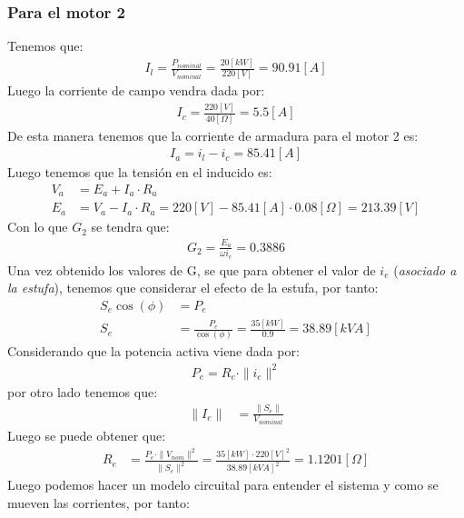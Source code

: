 \documentclass[
  11pt,
  letterpaper,
   addpoints,
   answers
  ]{exam}
\begin{document}
\begin{questions}
\begin{solution}
   \subsubsection*{Para el motor 2}
   Tenemos que:
   \begin{align}
        I_{l} = \frac{P_{nominal}}{V_{nominal}} = \frac{20[kW]}{220[V]} = 90.91[A]
   \end{align}
   Luego la corriente de campo vendra dada por:
    \begin{align}
          I_{c} = \frac{220[V]}{40[\Omega]} = 5.5[A]
    \end{align}
    De esta manera tenemos que la corriente de armadura para el motor 2 es:
    \begin{align}
        I_{a} = i_{l} - i_{c} = 85.41[A]
    \end{align}
    Luego tenemos que la tensión en el inducido es:
    \begin{align}
        V_{a} &= E_{a} + I_{a} \cdot R_{a}\\
        E_{a} &= V_{a} - I_{a} \cdot R_{a} = 220[V] - 85.41[A] \cdot 0.08[\Omega] = 213.39[V]
    \end{align}
    Con lo que $G_{2}$ se tendra que:
    \begin{align}
        G_{2}= \frac{E_{a}}{\omega i_{c} } =0.3886
    \end{align}
    Una vez obtenido los valores de G, se que para obtener el valor de $i_{e}$ (\textit{asociado a la estufa}), tenemos que considerar el efecto de la estufa, por tanto:
    \begin{align}
        S_{e}\cos(\phi) &= P_{e}\\
        S_{e} &= \frac{P_{e}}{\cos(\phi)} = \frac{35[kW]}{0.9} = 38.89[kVA]
    \end{align}
    Considerando que la potencia activa viene dada por:
    \begin{align}
        P_{e} = R_{e} \cdot \|i_{e}\|^2
    \end{align}
    por otro lado tenemos que:
    \begin{align}
        \|I_{e}\| & = \frac{\|S_{e}\|}{V_{nominal}}
    \end{align}
    Luego se puede obtener que:
    \begin{align}
        R_{e} &= \frac{P_{e} \cdot \|V_{nom}\|^{2}}{\|S_{e}\|^{2}} = \frac{35[kW] \cdot 220[V]^{2}}{38.89[kVA]^{2}} = 1.1201[\Omega]
    \end{align}
    Luego podemos hacer un modelo circuital para entender el sistema y como se mueven las corrientes, por tanto:

\end{solution}
\end{questions}
\end{document}
